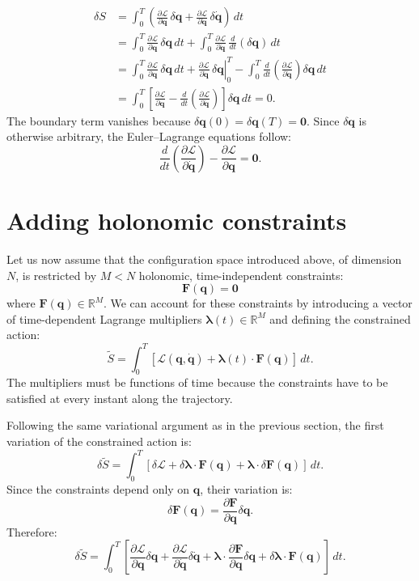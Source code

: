 \documentclass{article}
\begin{document}
\begin{align*}
\delta S
&= \int_0^T
\left(
\frac{\partial \mathcal L}{\partial \bm q}\,\delta\bm q
+
\frac{\partial \mathcal L}{\partial \dot{\bm q}}\,
\delta\dot{\bm q}
\right)\,dt \\
&= \int_0^T
\frac{\partial \mathcal L}{\partial \bm q}\,\delta\bm q\,dt
+
\int_0^T
\frac{\partial \mathcal L}{\partial \dot{\bm q}}\,
\frac{d}{dt}\left(\delta\bm q\right)\,dt \\
&= \int_0^T
\frac{\partial \mathcal L}{\partial \bm q}\,\delta\bm q\,dt
+
\left.
\frac{\partial \mathcal L}{\partial \dot{\bm q}}\,
\delta\bm q
\right|_0^T
-
\int_0^T
\frac{d}{dt}\left(
\frac{\partial \mathcal L}{\partial \dot{\bm q}}
\right)
\delta\bm q\,dt \\
&= \int_0^T
\left[
\frac{\partial \mathcal L}{\partial \bm q}
-
\frac{d}{dt}\left(
\frac{\partial \mathcal L}{\partial \dot{\bm q}}
\right)
\right]
\delta\bm q\,dt
= 0.
\end{align*}
The boundary term vanishes because $\delta\bm q(0)=\delta\bm q(T)=\bm 0$. Since $\delta\bm q$ is otherwise arbitrary, the Euler--Lagrange equations follow:
$$
\boxed{
\frac{d}{dt}\left(
\frac{\partial \mathcal L}{\partial \dot{\bm q}}
\right)
-
\frac{\partial \mathcal L}{\partial \bm q}
=
\bm 0.}
$$

\section{Adding holonomic constraints}
Let us now assume that the configuration space introduced above, of dimension $N$, is restricted by $M<N$ holonomic, time-independent constraints:
$$
\bm F(\bm q)=\bm 0
$$
where $\bm F(\bm q)\in\mathbb R^M$. We can account for these constraints by introducing a vector of time-dependent Lagrange multipliers $\bm\lambda(t)\in\mathbb R^M$ and defining the constrained action:
$$
\widetilde{S}
=
\int_0^T
\left[
\mathcal L(\bm q,\dot{\bm q})
+
\bm\lambda(t)\cdot\bm F(\bm q)
\right]\,dt.
$$
The multipliers must be functions of time because the constraints have to be satisfied at every instant along the trajectory.

Following the same variational argument as in the previous section, the first variation of the constrained action is:
$$
\delta\widetilde{S}
=
\int_0^T
\left[
\delta\mathcal L
+
\delta\bm\lambda\cdot\bm F(\bm q)
+
\bm\lambda\cdot\delta\bm F(\bm q)
\right]\,dt.
$$
Since the constraints depend only on $\bm q$, their variation is:
$$
\delta\bm F(\bm q)
=
\frac{\partial\bm F}{\partial\bm q}\delta\bm q.
$$
Therefore:
$$
\delta\widetilde{S}
=
\int_0^T
\left[
\frac{\partial\mathcal L}{\partial\bm q}\delta\bm q
+
\frac{\partial\mathcal L}{\partial\dot{\bm q}}\delta\dot{\bm q}
+
\bm\lambda\cdot
\frac{\partial\bm F}{\partial\bm q}\delta\bm q
+
\delta\bm\lambda\cdot\bm F(\bm q)
\right]\,dt.
$$
\end{document}
